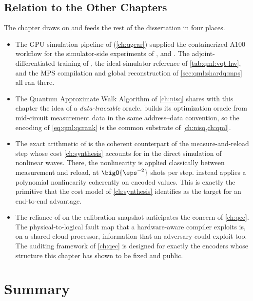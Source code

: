 \subsection{Relation to the Other Chapters}\label{sec:qml:synthesis:bridges}

The chapter draws on and feeds the rest of the dissertation in four places.
\begin{itemize}
\item The GPU simulation pipeline of \qgear{} (\cref{ch:qgear}) supplied the containerized A100 workflow for the simulator-side experiments of \qpie{}, \vqt{} and \shardq{}. The adjoint-differentiated training of \qpie{}, the ideal-simulator reference of \cref{tab:qml:vqt-hw}, and the MPS compilation and global reconstruction of \cref{sec:qml:shardq:mps} all ran there.
\item The Quantum Approximate Walk Algorithm of \cref{ch:nisq} shares with this chapter the idea of a \emph{data-traceable} oracle. \qawa{} builds its optimization oracle from mid-circuit measurement data in the same address--data convention, so the encoding of \cref{eq:qml:qcrank} is the common substrate of \cref{ch:nisq,ch:qml}.
\item The exact arithmetic of \nnqa{} is the coherent counterpart of the measure-and-reload step whose cost \cref{ch:synthesis} accounts for in the direct simulation of nonlinear waves. There, the nonlinearity is applied classically between measurement and reload, at $\bigO{\eps^{-2}}$ shots per step. \nnqa{} instead applies a polynomial nonlinearity coherently on encoded values. This is exactly the primitive that the cost model of \cref{ch:synthesis} identifies as the target for an end-to-end advantage.
\item The reliance of \shardq{} on the calibration snapshot anticipates the concern of \cref{ch:qec}. The physical-to-logical fault map that a hardware-aware compiler exploits is, on a shared cloud processor, information that an adversary could exploit too. The auditing framework of \cref{ch:qec} is designed for exactly the encoders whose structure this chapter has shown to be fixed and public.
\end{itemize}

\section{Summary}\label{sec:qml:summary}

